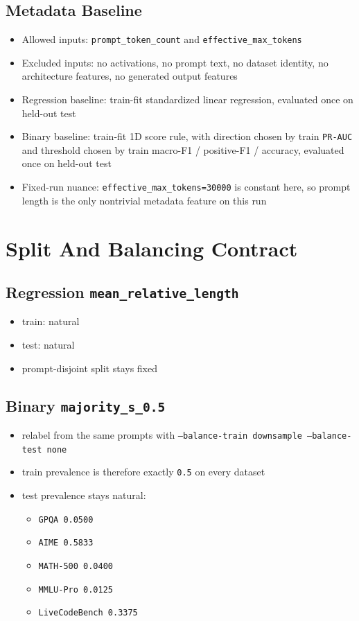 \documentclass[11pt]{article}
\begin{document}
\subsection*{Metadata Baseline}
\begin{itemize}[leftmargin=1.5em]
\item Allowed inputs: \texttt{prompt\_token\_count} and \texttt{effective\_max\_tokens}
\item Excluded inputs: no activations, no prompt text, no dataset identity, no architecture features, no generated output features
\item Regression baseline: train-fit standardized linear regression, evaluated once on held-out test
\item Binary baseline: train-fit 1D score rule, with direction chosen by train \texttt{PR-AUC} and threshold chosen by train macro-F1 / positive-F1 / accuracy, evaluated once on held-out test
\item Fixed-run nuance: \texttt{effective\_max\_tokens=30000} is constant here, so prompt length is the only nontrivial metadata feature on this run
\end{itemize}

\section*{Split And Balancing Contract}
\subsection*{Regression \texttt{mean\_relative\_length}}
\begin{itemize}[leftmargin=1.5em]
\item train: natural
\item test: natural
\item prompt-disjoint split stays fixed
\end{itemize}

\subsection*{Binary \texttt{majority\_s\_0.5}}
\begin{itemize}[leftmargin=1.5em]
\item relabel from the same prompts with \texttt{--balance-train downsample --balance-test none}
\item train prevalence is therefore exactly \texttt{0.5} on every dataset
\item test prevalence stays natural:
  \begin{itemize}[leftmargin=1.5em]
  \item \texttt{GPQA 0.0500}
  \item \texttt{AIME 0.5833}
  \item \texttt{MATH-500 0.0400}
  \item \texttt{MMLU-Pro 0.0125}
  \item \texttt{LiveCodeBench 0.3375}
  \end{itemize}
\end{itemize}
\end{document}
